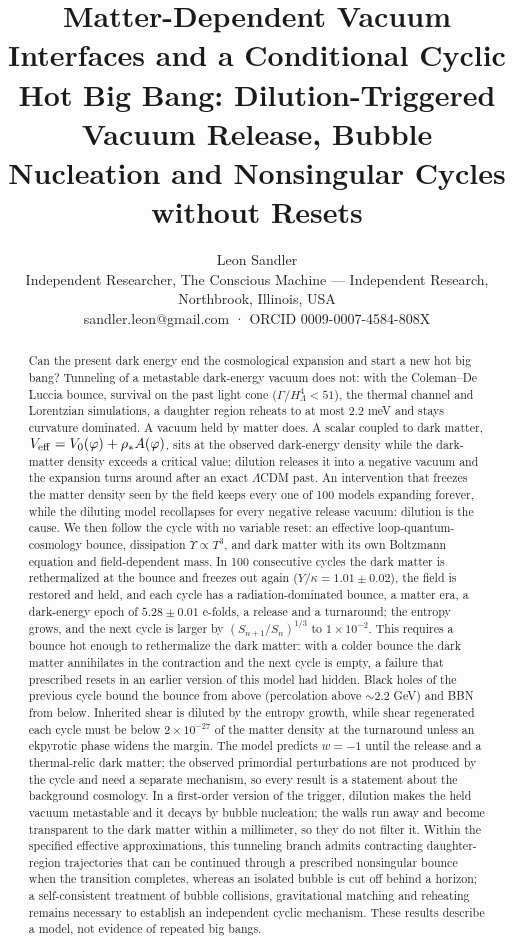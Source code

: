 \documentclass[11pt,a4paper]{article}
\title{Matter-Dependent Vacuum Interfaces and a Conditional Cyclic Hot Big Bang: Dilution-Triggered Vacuum Release, Bubble Nucleation and Nonsingular Cycles without Resets}
\author{Leon Sandler \\ Independent Researcher, The Conscious Machine --- Independent Research, Northbrook, Illinois, USA \\ sandler.leon@gmail.com   ·   ORCID 0009-0007-4584-808X}
\date{}
\begin{document}
\maketitle

\begin{abstract}
Can the present dark energy end the cosmological expansion and start a new hot big bang? Tunneling of a metastable dark-energy vacuum does not: with the Coleman--De Luccia bounce, survival on the past light cone ($\Gamma/H_\Lambda^4<51$), the thermal channel and Lorentzian simulations, a daughter region reheats to at most $2.2$ meV and stays curvature dominated. A vacuum held by matter does. A scalar coupled to dark matter, $V_{\rm eff}=V_0(\varphi)+\rho_*A(\varphi)$, sits at the observed dark-energy density while the dark-matter density exceeds a critical value; dilution releases it into a negative vacuum and the expansion turns around after an exact $\Lambda$CDM past. An intervention that freezes the matter density seen by the field keeps every one of 100 models expanding forever, while the diluting model recollapses for every negative release vacuum: dilution is the cause. We then follow the cycle with no variable reset: an effective loop-quantum-cosmology bounce, dissipation $\Upsilon\propto T^3$, and dark matter with its own Boltzmann equation and field-dependent mass. In 100 consecutive cycles the dark matter is rethermalized at the bounce and freezes out again ($Y/\kappa=1.01\pm0.02$), the field is restored and held, and each cycle has a radiation-dominated bounce, a matter era, a dark-energy epoch of $5.28\pm0.01$ e-folds, a release and a turnaround; the entropy grows, and the next cycle is larger by $(S_{n+1}/S_n)^{1/3}$ to $1\times10^{-2}$. This requires a bounce hot enough to rethermalize the dark matter: with a colder bounce the dark matter annihilates in the contraction and the next cycle is empty, a failure that prescribed resets in an earlier version of this model had hidden. Black holes of the previous cycle bound the bounce from above (percolation above $\sim2.2$ GeV) and BBN from below. Inherited shear is diluted by the entropy growth, while shear regenerated each cycle must be below $2\times10^{-27}$ of the matter density at the turnaround unless an ekpyrotic phase widens the margin. The model predicts $w=-1$ until the release and a thermal-relic dark matter; the observed primordial perturbations are not produced by the cycle and need a separate mechanism, so every result is a statement about the background cosmology. In a first-order version of the trigger, dilution makes the held vacuum metastable and it decays by bubble nucleation; the walls run away and become transparent to the dark matter within a millimeter, so they do not filter it. Within the specified effective approximations, this tunneling branch admits contracting daughter-region trajectories that can be continued through a prescribed nonsingular bounce when the transition completes, whereas an isolated bubble is cut off behind a horizon; a self-consistent treatment of bubble collisions, gravitational matching and reheating remains necessary to establish an independent cyclic mechanism. These results describe a model, not evidence of repeated big bangs.
\end{abstract}
\end{document}

